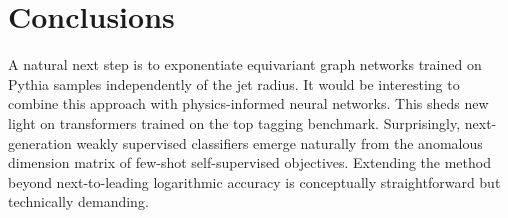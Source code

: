 \section{Conclusions}\label{sec:conclusions}

A natural next step is to exponentiate equivariant graph networks
trained on Pythia samples independently of the jet radius. It would be
interesting to combine this approach with physics-informed neural
networks. This sheds new light on transformers trained on the top
tagging benchmark. Surprisingly, next-generation weakly supervised
classifiers emerge naturally from the anomalous dimension matrix of
few-shot self-supervised objectives. Extending the method beyond
next-to-leading logarithmic accuracy is conceptually straightforward but
technically demanding.

